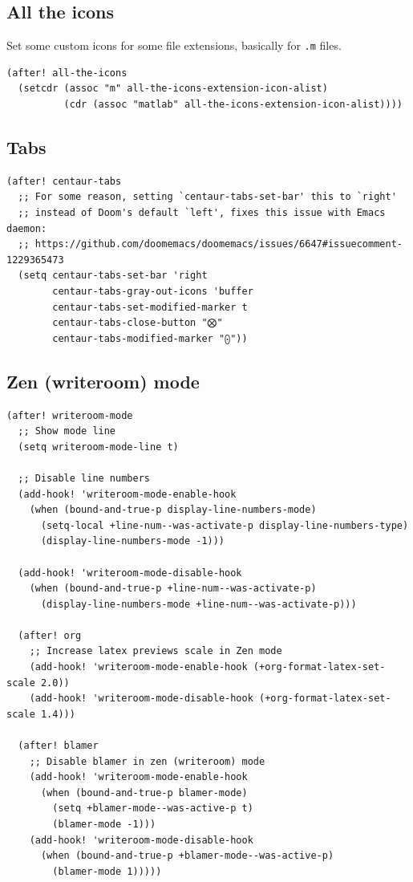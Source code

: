\documentclass[11pt]{article}
\begin{document}
\subsection{All the icons}
\label{sec:org7061155}
Set some custom icons for some file extensions, basically for \texttt{.m} files.

\begin{verbatim}
(after! all-the-icons
  (setcdr (assoc "m" all-the-icons-extension-icon-alist)
          (cdr (assoc "matlab" all-the-icons-extension-icon-alist))))
\end{verbatim}

\subsection{Tabs}
\label{sec:org49db051}

\begin{verbatim}
(after! centaur-tabs
  ;; For some reason, setting `centaur-tabs-set-bar' this to `right'
  ;; instead of Doom's default `left', fixes this issue with Emacs daemon:
  ;; https://github.com/doomemacs/doomemacs/issues/6647#issuecomment-1229365473
  (setq centaur-tabs-set-bar 'right
        centaur-tabs-gray-out-icons 'buffer
        centaur-tabs-set-modified-marker t
        centaur-tabs-close-button "⨂"
        centaur-tabs-modified-marker "⨀"))
\end{verbatim}

\subsection{Zen (writeroom) mode}
\label{sec:orgd6b8951}

\begin{verbatim}
(after! writeroom-mode
  ;; Show mode line
  (setq writeroom-mode-line t)

  ;; Disable line numbers
  (add-hook! 'writeroom-mode-enable-hook
    (when (bound-and-true-p display-line-numbers-mode)
      (setq-local +line-num--was-activate-p display-line-numbers-type)
      (display-line-numbers-mode -1)))

  (add-hook! 'writeroom-mode-disable-hook
    (when (bound-and-true-p +line-num--was-activate-p)
      (display-line-numbers-mode +line-num--was-activate-p)))

  (after! org
    ;; Increase latex previews scale in Zen mode
    (add-hook! 'writeroom-mode-enable-hook (+org-format-latex-set-scale 2.0))
    (add-hook! 'writeroom-mode-disable-hook (+org-format-latex-set-scale 1.4)))

  (after! blamer
    ;; Disable blamer in zen (writeroom) mode
    (add-hook! 'writeroom-mode-enable-hook
      (when (bound-and-true-p blamer-mode)
        (setq +blamer-mode--was-active-p t)
        (blamer-mode -1)))
    (add-hook! 'writeroom-mode-disable-hook
      (when (bound-and-true-p +blamer-mode--was-active-p)
        (blamer-mode 1)))))
\end{verbatim}
\end{document}
